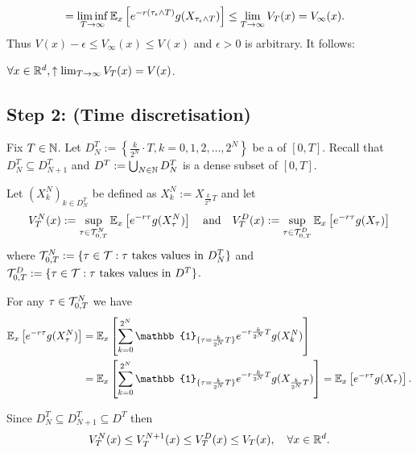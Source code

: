 
\begin{align*}
    &= \liminf_{T \to \infty} \mathbb E_x \left[ e^{-r(\tau_\epsilon \wedge T)} g(X_{\tau_\epsilon \wedge T}) \right] \leq \lim_{T \to \infty} V_T(x) = V_\infty(x).
\end{align*}
Thus $V(x) - \epsilon \leq V_\infty(x) \leq V(x)$ and $\epsilon > 0$ is arbitrary. It follows:

\begin{lemma}
    $\forall x \in \mathbb R^d, \uparrow \lim_{T \to \infty} V_T(x) = V(x)$.
\end{lemma}

\subsection*{Step 2: (Time discretisation)}

Fix $T \in \mathbb N$. Let $D_N^T := \left\{ \frac{k}{2^N} \cdot T, k = 0, 1, 2, \dots, 2^N \right\}$ be a  of $[0, T]$. Recall that $D_N^T \subseteq D_{N+1}^T$ and $D^T := \bigcup_{N \in \mathbb N} D_N^T$ is a dense subset of $[0, T]$.

Let $(X_k^N)_{k \in D_N^T}$ be defined as $X_k^N := X_{\frac{k}{2^N}T}$ and let
\begin{equation*}
    V_T^N(x) := \sup_{\tau \in \mathcal{T}_{0,T}^N} \mathbb E_x \left[ e^{-r\tau} g(X_\tau^N) \right] \quad \text{and} \quad V_T^D(x) := \sup_{\tau \in \mathcal{T}_{0,T}^D} \mathbb E_x \left[ e^{-r\tau} g(X_\tau) \right]
\end{equation*}
where $\mathcal{T}_{0,T}^N := \{ \tau \in \mathcal{T} : \tau \text{ takes values in } D_N^T \}$ and $\mathcal{T}_{0,T}^D := \{ \tau \in \mathcal{T} : \tau \text{ takes values in } D^T \}$.

\begin{remark}
    For any $\tau \in \mathcal{T}_{0,T}^N$ we have
    \begin{align*}
        \EE_x \left[ e^{-r\tau} g(X_\tau^N) \right] &= \EE_x \left[ \sum_{k=0}^{2^N} \mathbb{1}_{\{\tau = \frac{k}{2^N}T\}} e^{-r \frac{k}{2^N}T} g(X_k^N) \right] \\
        &= \EE_x \left[ \sum_{k=0}^{2^N} \mathbb{1}_{\{\tau = \frac{k}{2^N}T\}} e^{-r \frac{k}{2^N}T} g(X_{\frac{k}{2^N}T}) \right] = \EE_x \left[ e^{-r\tau} g(X_\tau) \right].
    \end{align*}
\end{remark}

Since $D_N^T \subseteq D_{N+1}^T \subseteq D^T$ then
\begin{equation*}
    V_T^N(x) \leq V_T^{N+1}(x) \leq V_T^D(x) \leq V_T(x), \quad \forall x \in \mathbb R^d.
\end{equation*}

